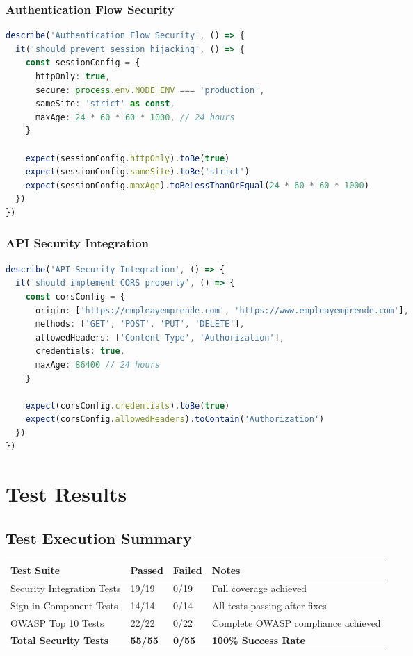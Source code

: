\documentclass[12pt]{article}
\begin{document}
\subsubsection{Authentication Flow Security}
\begin{lstlisting}[language=typescript, caption=Session Security Test]
describe('Authentication Flow Security', () => {
  it('should prevent session hijacking', () => {
    const sessionConfig = {
      httpOnly: true,
      secure: process.env.NODE_ENV === 'production',
      sameSite: 'strict' as const,
      maxAge: 24 * 60 * 60 * 1000, // 24 hours
    }

    expect(sessionConfig.httpOnly).toBe(true)
    expect(sessionConfig.sameSite).toBe('strict')
    expect(sessionConfig.maxAge).toBeLessThanOrEqual(24 * 60 * 60 * 1000)
  })
})
\end{lstlisting}

\subsubsection{API Security Integration}
\begin{lstlisting}[language=typescript, caption=CORS Security Test]
describe('API Security Integration', () => {
  it('should implement CORS properly', () => {
    const corsConfig = {
      origin: ['https://empleayemprende.com', 'https://www.empleayemprende.com'],
      methods: ['GET', 'POST', 'PUT', 'DELETE'],
      allowedHeaders: ['Content-Type', 'Authorization'],
      credentials: true,
      maxAge: 86400 // 24 hours
    }

    expect(corsConfig.credentials).toBe(true)
    expect(corsConfig.allowedHeaders).toContain('Authorization')
  })
})
\end{lstlisting}

\section{Test Results}

\subsection{Test Execution Summary}

\begin{longtable}{|p{4cm}|p{2cm}|p{2cm}|p{5cm}|}
\hline
\textbf{Test Suite} & \textbf{Passed} & \textbf{Failed} & \textbf{Notes} \\
\hline
Security Integration Tests & 19/19 & 0/19 & Full coverage achieved \\
\hline
Sign-in Component Tests & 14/14 & 0/14 & All tests passing after fixes \\
\hline
OWASP Top 10 Tests & 22/22 & 0/22 & Complete OWASP compliance achieved \\
\hline
\textbf{Total Security Tests} & \textbf{55/55} & \textbf{0/55} & \textbf{100\% Success Rate} \\
\hline
\end{longtable}
\end{document}
